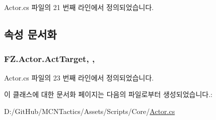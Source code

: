 Actor.\+cs 파일의 21 번째 라인에서 정의되었습니다.



\subsection{속성 문서화}
\subsubsection[{\texorpdfstring{Act\+Target}{ActTarget}}]{ F\+Z.\+Actor.\+Act\+Target\hspace{0.3cm}{\ttfamily [get]}, {}, {\ttfamily [protected]}}\hypertarget{class_f_z_1_1_actor_add19d5c2a31b5c4482cbf9ba0a399ecd}{}\label{class_f_z_1_1_actor_add19d5c2a31b5c4482cbf9ba0a399ecd}


Actor.\+cs 파일의 23 번째 라인에서 정의되었습니다.



이 클래스에 대한 문서화 페이지는 다음의 파일로부터 생성되었습니다.\+:\begin{DoxyCompactItemize}
\item 
D\+:/\+Git\+Hub/\+M\+C\+N\+Tactics/\+Assets/\+Scripts/\+Core/\hyperlink{_actor_8cs}{Actor.\+cs}\end{DoxyCompactItemize}
